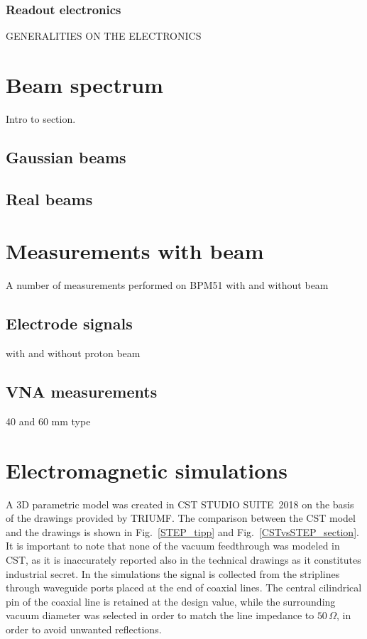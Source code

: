\subsubsection{Readout electronics}

GENERALITIES ON THE ELECTRONICS


\section[Beam spectrum]{Beam spectrum}

Intro to section.

\subsection[Gaussian beams]{Gaussian beams}

\subsection[Real beams]{Real beams}


\section[Measurements with beam]{Measurements with beam}

A number of measurements performed on BPM51 with and without beam

\subsection[Electrode signals]{Electrode signals}

with and without proton beam

\subsection[VNA measurements]{VNA measurements}

40 and 60 mm type

\section[Electromagnetic simulations]{Electromagnetic simulations}

A 3D parametric model was created in CST STUDIO SUITE\textregistered~2018 on the basis of the drawings provided by TRIUMF. The comparison between the CST model and the drawings is shown in Fig.~\ref{STEP_tipp} and Fig.~\ref{CSTvsSTEP_section}. It is important to note that none of the vacuum feedthrough was modeled in CST, as it is inaccurately reported also in the technical drawings as it constitutes industrial secret. In the simulations the signal is collected from the striplines through waveguide ports placed at the end of coaxial lines. The central cilindrical pin of the coaxial line is retained at the design value, while the surrounding vacuum diameter was selected in order to match the line impedance to $50\,\Omega$, in order to avoid unwanted reflections.

